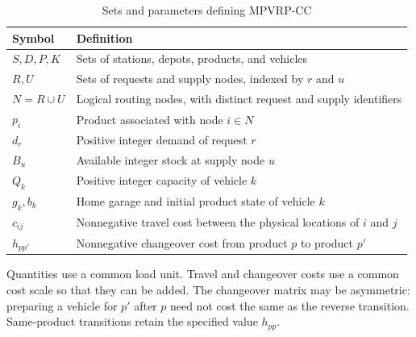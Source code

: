 \begin{table}[htbp]
\centering
\caption{Sets and parameters defining MPVRP-CC}\label{tab:common-sets}
\begin{tabularx}{\textwidth}{@{}lX@{}}
\toprule Symbol & Definition \\ \midrule
$S,D,P,K$ & Sets of stations, depots, products, and vehicles \\
$R,U$ & Sets of requests and supply nodes, indexed by $r$ and $u$ \\
$N=R\cup U$ & Logical routing nodes, with distinct request and supply identifiers \\
$p_i$ & Product associated with node $i\in N$ \\
$d_r$ & Positive integer demand of request $r$ \\
$B_u$ & Available integer stock at supply node $u$ \\
$Q_k$ & Positive integer capacity of vehicle $k$ \\
$g_k,b_k$ & Home garage and initial product state of vehicle $k$ \\
$c_{ij}$ & Nonnegative travel cost between the physical locations of $i$ and $j$ \\
$h_{pp'}$ & Nonnegative changeover cost from product $p$ to product $p'$ \\
\bottomrule
\end{tabularx}
\end{table}

Quantities use a common load unit. Travel and changeover costs use a common
cost scale so that they can be added. The changeover matrix may be asymmetric:
preparing a vehicle for $p'$ after $p$ need not cost the same as the reverse
transition. Same-product transitions retain the specified value $h_{pp}$.

